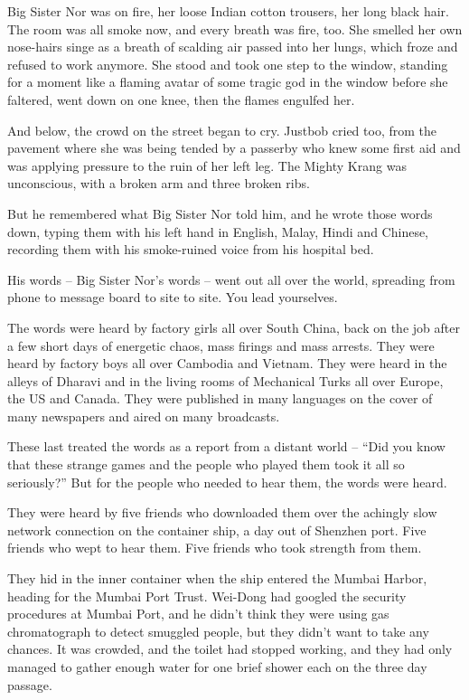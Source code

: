 Big Sister Nor was on fire, her loose Indian cotton trousers, her
long black hair. The room was all smoke now, and every breath was
fire, too. She smelled her own nose-hairs singe as a breath of
scalding air passed into her lungs, which froze and refused to work
anymore. She stood and took one step to the window, standing for a
moment like a flaming avatar of some tragic god in the window
before she faltered, went down on one knee, then the flames
engulfed her.

And below, the crowd on the street began to cry. Justbob cried too,
from the pavement where she was being tended by a passerby who knew
some first aid and was applying pressure to the ruin of her left
leg. The Mighty Krang was unconscious, with a broken arm and three
broken ribs.

But he remembered what Big Sister Nor told him, and he wrote those
words down, typing them with his left hand in English, Malay, Hindi
and Chinese, recording them with his smoke-ruined voice from his
hospital bed.

His words -- Big Sister Nor's words -- went out all over the world,
spreading from phone to message board to site to site. You lead
yourselves.

The words were heard by factory girls all over South China, back on
the job after a few short days of energetic chaos, mass firings and
mass arrests. They were heard by factory boys all over Cambodia and
Vietnam. They were heard in the alleys of Dharavi and in the living
rooms of Mechanical Turks all over Europe, the US and Canada. They
were published in many languages on the cover of many newspapers
and aired on many broadcasts.

These last treated the words as a report from a distant world --
``Did you know that these strange games and the people who played
them took it all so seriously?'' But for the people who needed to
hear them, the words were heard.

They were heard by five friends who downloaded them over the
achingly slow network connection on the container ship, a day out
of Shenzhen port. Five friends who wept to hear them. Five friends
who took strength from them.

\tb

They hid in the inner container when the ship entered the Mumbai
Harbor, heading for the Mumbai Port Trust. Wei-Dong had googled the
security procedures at Mumbai Port, and he didn't think they were
using gas chromatograph to detect smuggled people, but they didn't
want to take any chances. It was crowded, and the toilet had
stopped working, and they had only managed to gather enough water
for one brief shower each on the three day passage.

